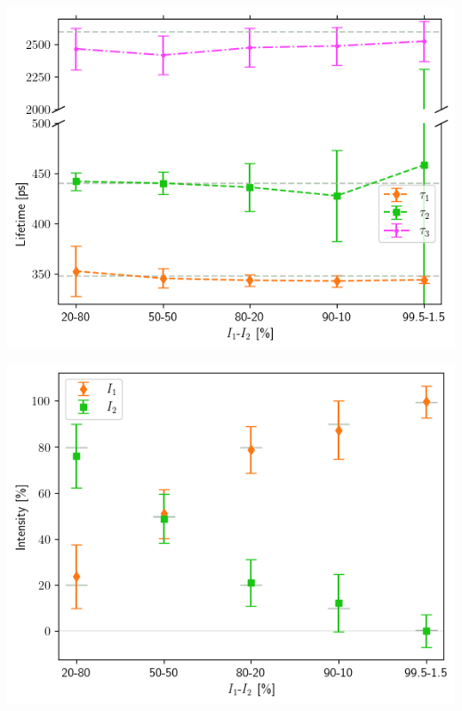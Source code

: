 \begin{minipage}{.47\linewidth}
     
    \includegraphics[width=\linewidth]{Batch 7/348-440/output/3 life/lifetimes.png}
    \label{fig:348-440-3life}
\end{minipage}
\hfill
\begin{minipage}{.47\linewidth}
     
    \includegraphics[width=\linewidth]{Batch 7/348-440/output/3 life/intensities.png}
    \label{fig:348-440-3lifeint}
\end{minipage}

